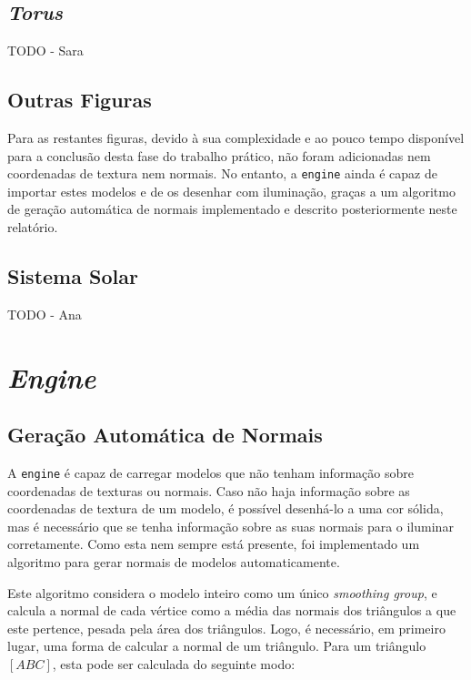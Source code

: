 \documentclass[12pt, a4paper]{article}
\begin{document}
\subsection{\emph{Torus}}

{\color{red} TODO - Sara}

\subsection{Outras Figuras}

Para as restantes figuras, devido à sua complexidade e ao pouco tempo disponível para a conclusão
desta fase do trabalho prático, não foram adicionadas nem coordenadas de textura nem normais. No
entanto, a \texttt{engine} ainda é capaz de importar estes modelos e de os desenhar com iluminação,
graças a um algoritmo de geração automática de normais implementado e descrito posteriormente neste
relatório.

\subsection{Sistema Solar}

{\color{red} TODO - Ana}

\section{\emph{Engine}}

\subsection{Geração Automática de Normais}

A \texttt{engine} é capaz de carregar modelos que não tenham informação sobre coordenadas de
texturas ou normais. Caso não haja informação sobre as coordenadas de textura de um modelo, é
possível desenhá-lo a uma cor sólida, mas é necessário que se tenha informação sobre as suas normais
para o iluminar corretamente. Como esta nem sempre está presente, foi implementado um algoritmo para
gerar normais de modelos automaticamente.

Este algoritmo considera o modelo inteiro como um único \emph{smoothing group}, e calcula a normal
de cada vértice como a média das normais dos triângulos a que este pertence, pesada pela área dos
triângulos. Logo, é necessário, em primeiro lugar, uma forma de calcular a normal de um triângulo.
Para um triângulo $[ABC]$, esta pode ser calculada do seguinte modo:
\end{document}
